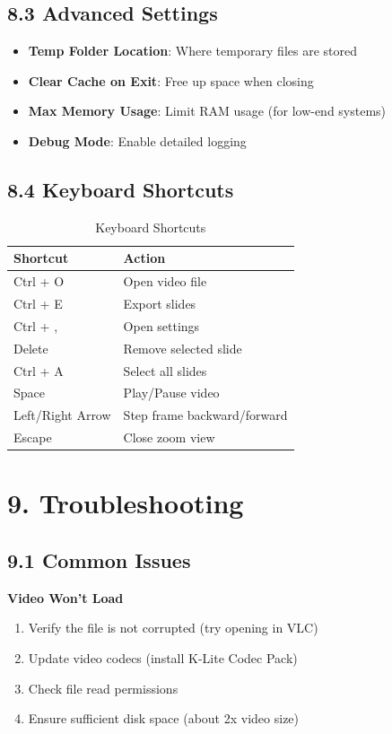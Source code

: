 \documentclass[12pt,a4paper]{article}
\newcommand{\sectionTitle}[1]{\section*{#1}}
\newcommand{\subsectionTitle}[1]{\subsection*{#1}}
\begin{document}
\subsectionTitle{8.3 Advanced Settings}

\begin{itemize}
    \item \textbf{Temp Folder Location}: Where temporary files are stored
    \item \textbf{Clear Cache on Exit}: Free up space when closing
    \item \textbf{Max Memory Usage}: Limit RAM usage (for low-end systems)
    \item \textbf{Debug Mode}: Enable detailed logging
\end{itemize}

\subsectionTitle{8.4 Keyboard Shortcuts}

\begin{table}[H]
    \centering
    \caption{Keyboard Shortcuts}
    \begin{tabular}{ll}
        \toprule
        \textbf{Shortcut} & \textbf{Action} \\
        \midrule
        Ctrl + O & Open video file \\
        Ctrl + E & Export slides \\
        Ctrl + , & Open settings \\
        Delete & Remove selected slide \\
        Ctrl + A & Select all slides \\
        Space & Play/Pause video \\
        Left/Right Arrow & Step frame backward/forward \\
        Escape & Close zoom view \\
        \bottomrule
    \end{tabular}
\end{table}

\newpage

\sectionTitle{9. Troubleshooting}

\subsectionTitle{9.1 Common Issues}

\textbf{Video Won't Load}
\begin{enumerate}
    \item Verify the file is not corrupted (try opening in VLC)
    \item Update video codecs (install K-Lite Codec Pack)
    \item Check file read permissions
    \item Ensure sufficient disk space (about 2x video size)
\end{enumerate}
\end{document}
